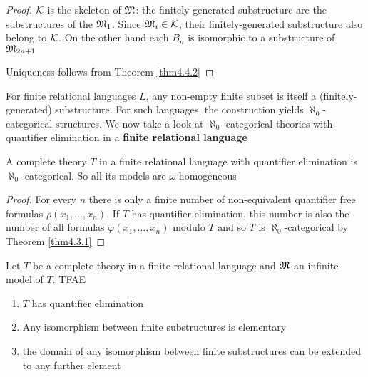 \documentclass[11pt]{article}
\begin{document}
\begin{proof}
\(\mathcal{K}\) is the skeleton of \(\mathfrak{M}\): the finitely-generated substructure are the substructures of
the \(\mathfrak{M}_1\). Since \(\mathfrak{M}_i\in\mathcal{K}\), their finitely-generated substructure also belong to \(\mathcal{K}\). On the
other hand each \(B_n\) is isomorphic to a substructure of \(\mathfrak{M}_{2n+1}\)

Uniqueness follows from Theorem \ref{thm4.4.2}
\end{proof}

For finite relational languages \(L\), any non-empty finite subset is itself a
(finitely-generated) substructure. For such languages, the construction
yields \(\aleph_0\)-categorical structures.  We now take a look at \(\aleph_0\)-categorical theories with
quantifier elimination in a \textbf{finite relational language}

\begin{remark}
A complete theory \(T\) in a finite relational language with quantifier elimination
is \(\aleph_0\)-categorical. So all its models are \(\omega\)-homogeneous
\end{remark}

\begin{proof}
For every \(n\) there is only a finite number of non-equivalent quantifier free
formulas \(\rho(x_1,\dots,x_n)\). If \(T\) has quantifier elimination, this number is also the number of
all formulas \(\varphi(x_1,\dots,x_n)\) modulo \(T\) and so \(T\) is \(\aleph_0\)-categorical by Theorem \ref{thm4.3.1}
\end{proof}

\begin{lemma}[]
Let \(T\) be a complete theory in a finite relational language and \(\mathfrak{M}\) an infinite model
of \(T\). TFAE
\begin{enumerate}
\item \(T\) has quantifier elimination
\item Any isomorphism between finite substructures is elementary
\item the domain of any isomorphism between finite substructures can be extended to any further element
\end{enumerate}
\end{lemma}
\end{document}
